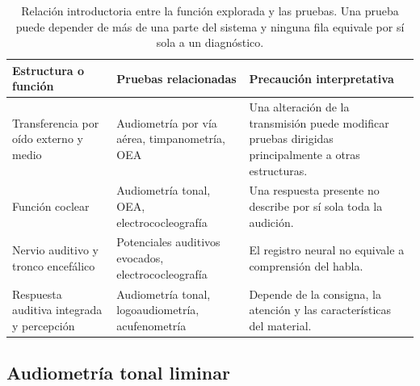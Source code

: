 \begin{table}[htbp]
    \centering
    \caption{Relación introductoria entre la función explorada y las pruebas.
    Una prueba puede depender de más de una parte del sistema y ninguna fila
    equivale por sí sola a un diagnóstico.}
    \label{tab:u8-estructura-prueba}
    \small
    \setlength{\tabcolsep}{3pt}
    \begin{tabular}{
        >{\raggedright\arraybackslash}p{}
        >{\raggedright\arraybackslash}p{}
        >{\raggedright\arraybackslash}p{}}
        \hline
        \textbf{Estructura o función} &
        \textbf{Pruebas relacionadas} &
        \textbf{Precaución interpretativa} \\
        \hline
        Transferencia por oído externo y medio &
        Audiometría por vía aérea, timpanometría, OEA &
        Una alteración de la transmisión puede modificar pruebas dirigidas
        principalmente a otras estructuras. \\
        Función coclear &
        Audiometría tonal, OEA, electrococleografía &
        Una respuesta presente no describe por sí sola toda la audición. \\
        Nervio auditivo y tronco encefálico &
        Potenciales auditivos evocados, electrococleografía &
        El registro neural no equivale a comprensión del habla. \\
        Respuesta auditiva integrada y percepción &
        Audiometría tonal, logoaudiometría, acufenometría &
        Depende de la consigna, la atención y las características del
        material. \\
        \hline
    \end{tabular}
\end{table}

\subsection{Audiometría tonal liminar}
\label{sec:u8-audiometria}

